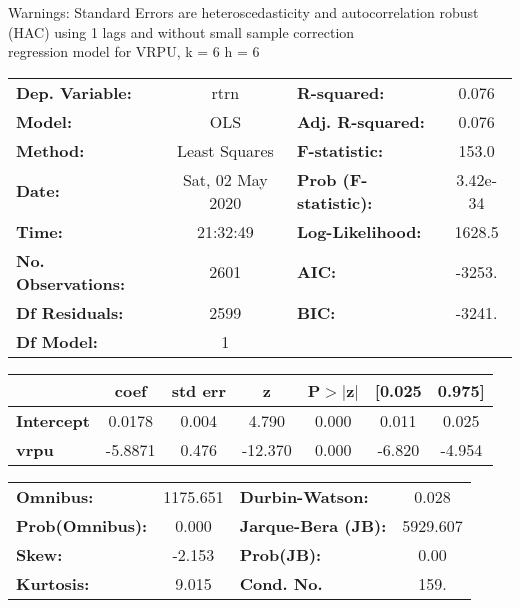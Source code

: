 Warnings: \newline
 [1] Standard Errors are heteroscedasticity and autocorrelation robust (HAC) using 1 lags and without small sample correction\\ 

regression model for VRPU, k = 6 h = 6\begin{center}
\begin{tabular}{lclc}
\toprule
\textbf{Dep. Variable:}    &       rtrn       & \textbf{  R-squared:         } &     0.076   \\
\textbf{Model:}            &       OLS        & \textbf{  Adj. R-squared:    } &     0.076   \\
\textbf{Method:}           &  Least Squares   & \textbf{  F-statistic:       } &     153.0   \\
\textbf{Date:}             & Sat, 02 May 2020 & \textbf{  Prob (F-statistic):} &  3.42e-34   \\
\textbf{Time:}             &     21:32:49     & \textbf{  Log-Likelihood:    } &    1628.5   \\
\textbf{No. Observations:} &        2601      & \textbf{  AIC:               } &    -3253.   \\
\textbf{Df Residuals:}     &        2599      & \textbf{  BIC:               } &    -3241.   \\
\textbf{Df Model:}         &           1      & \textbf{                     } &             \\
\bottomrule
\end{tabular}
\begin{tabular}{lcccccc}
                   & \textbf{coef} & \textbf{std err} & \textbf{z} & \textbf{P$> |$z$|$} & \textbf{[0.025} & \textbf{0.975]}  \\
\midrule
\textbf{Intercept} &       0.0178  &        0.004     &     4.790  &         0.000        &        0.011    &        0.025     \\
\textbf{vrpu}      &      -5.8871  &        0.476     &   -12.370  &         0.000        &       -6.820    &       -4.954     \\
\bottomrule
\end{tabular}
\begin{tabular}{lclc}
\textbf{Omnibus:}       & 1175.651 & \textbf{  Durbin-Watson:     } &    0.028  \\
\textbf{Prob(Omnibus):} &   0.000  & \textbf{  Jarque-Bera (JB):  } & 5929.607  \\
\textbf{Skew:}          &  -2.153  & \textbf{  Prob(JB):          } &     0.00  \\
\textbf{Kurtosis:}      &   9.015  & \textbf{  Cond. No.          } &     159.  \\
\bottomrule
\end{tabular}
\end{center}

